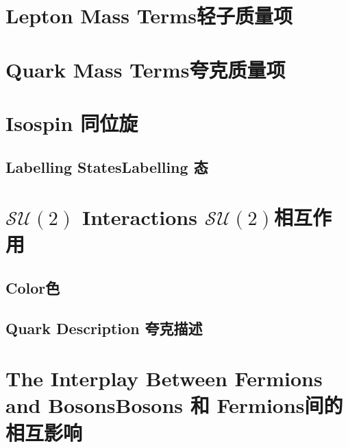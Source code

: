 \section[轻子质量项]{Lepton Mass Terms\quad 轻子质量项}\label{sec7.5}

\section[夸克质量项]{Quark Mass Terms\quad 夸克质量项}\label{sec7.6}

\section[同位旋]{Isospin \quad 同位旋}\label{sec7.7}

\subsection[Labelling 态]{Labelling States\quad Labelling 态}\label{sec7.7.1}

\section[$\mathcal{SU}(3)$相互作用]{$\mathcal{SU}(2)$ Interactions \quad $\mathcal{SU}(2)$相互作用}\label{sec7.8}

\subsection[色]{Color\quad 色}\label{sec7.8.1}

\subsection[夸克描述]{Quark Description \quad 夸克描述}\label{sec7.8.2}

\section[Bosons 和 Fermions 间的相互影响]{The Interplay Between Fermions and Bosons\quad Bosons 和 Fermions间的相互影响}\label{sec7.9}
